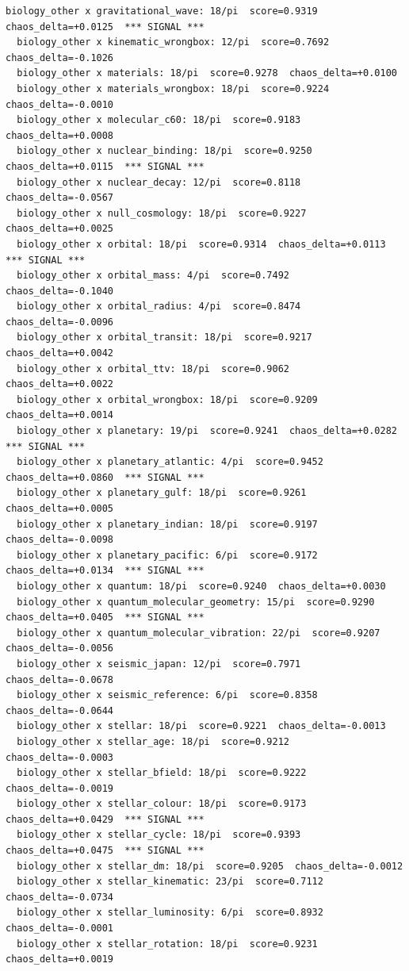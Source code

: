 \documentclass[11pt, letterpaper, openany]{book}
\begin{document}
\begin{empiricalbox}
\begin{lstlisting}[style=terminal]
  biology_other x gravitational_wave: 18/pi  score=0.9319  chaos_delta=+0.0125  *** SIGNAL ***
  biology_other x kinematic_wrongbox: 12/pi  score=0.7692  chaos_delta=-0.1026
  biology_other x materials: 18/pi  score=0.9278  chaos_delta=+0.0100
  biology_other x materials_wrongbox: 18/pi  score=0.9224  chaos_delta=-0.0010
  biology_other x molecular_c60: 18/pi  score=0.9183  chaos_delta=+0.0008
  biology_other x nuclear_binding: 18/pi  score=0.9250  chaos_delta=+0.0115  *** SIGNAL ***
  biology_other x nuclear_decay: 12/pi  score=0.8118  chaos_delta=-0.0567
  biology_other x null_cosmology: 18/pi  score=0.9227  chaos_delta=+0.0025
  biology_other x orbital: 18/pi  score=0.9314  chaos_delta=+0.0113  *** SIGNAL ***
  biology_other x orbital_mass: 4/pi  score=0.7492  chaos_delta=-0.1040
  biology_other x orbital_radius: 4/pi  score=0.8474  chaos_delta=-0.0096
  biology_other x orbital_transit: 18/pi  score=0.9217  chaos_delta=+0.0042
  biology_other x orbital_ttv: 18/pi  score=0.9062  chaos_delta=+0.0022
  biology_other x orbital_wrongbox: 18/pi  score=0.9209  chaos_delta=+0.0014
  biology_other x planetary: 19/pi  score=0.9241  chaos_delta=+0.0282  *** SIGNAL ***
  biology_other x planetary_atlantic: 4/pi  score=0.9452  chaos_delta=+0.0860  *** SIGNAL ***
  biology_other x planetary_gulf: 18/pi  score=0.9261  chaos_delta=+0.0005
  biology_other x planetary_indian: 18/pi  score=0.9197  chaos_delta=-0.0098
  biology_other x planetary_pacific: 6/pi  score=0.9172  chaos_delta=+0.0134  *** SIGNAL ***
  biology_other x quantum: 18/pi  score=0.9240  chaos_delta=+0.0030
  biology_other x quantum_molecular_geometry: 15/pi  score=0.9290  chaos_delta=+0.0405  *** SIGNAL ***
  biology_other x quantum_molecular_vibration: 22/pi  score=0.9207  chaos_delta=-0.0056
  biology_other x seismic_japan: 12/pi  score=0.7971  chaos_delta=-0.0678
  biology_other x seismic_reference: 6/pi  score=0.8358  chaos_delta=-0.0644
  biology_other x stellar: 18/pi  score=0.9221  chaos_delta=-0.0013
  biology_other x stellar_age: 18/pi  score=0.9212  chaos_delta=-0.0003
  biology_other x stellar_bfield: 18/pi  score=0.9222  chaos_delta=-0.0019
  biology_other x stellar_colour: 18/pi  score=0.9173  chaos_delta=+0.0429  *** SIGNAL ***
  biology_other x stellar_cycle: 18/pi  score=0.9393  chaos_delta=+0.0475  *** SIGNAL ***
  biology_other x stellar_dm: 18/pi  score=0.9205  chaos_delta=-0.0012
  biology_other x stellar_kinematic: 23/pi  score=0.7112  chaos_delta=-0.0734
  biology_other x stellar_luminosity: 6/pi  score=0.8932  chaos_delta=-0.0001
  biology_other x stellar_rotation: 18/pi  score=0.9231  chaos_delta=+0.0019

\end{lstlisting}
\end{empiricalbox}
\end{document}
